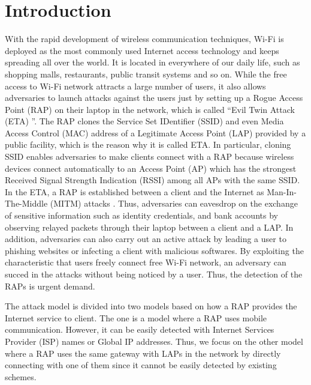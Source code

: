\documentclass[paper]{ieice}
\begin{document}
\section{Introduction}
With the rapid development of wireless communication techniques, Wi-Fi is deployed as the most commonly used Internet access technology and keeps spreading all over the world\cite{bg-evi}.
It is located in everywhere of our daily life, such as shopping malls, restaurants, public transit systems and so on.
While the free access to Wi-Fi network attracts a large number of users, it also allows adversaries to launch attacks against the users just by setting up a Rogue Access Point (RAP) on their laptop in the network, which is called ``Evil Twin Attack (ETA) ''\cite{laptop-evi}.
The RAP clones the Service Set IDentifier (SSID) and even Media Access Control (MAC) address of a Legitimate Access Point (LAP) provided by a public facility, which is the reason why it is called ETA.
In particular, cloning SSID enables adversaries to make clients connect with a RAP because wireless devices connect automatically to an Access Point (AP) which has the strongest Received Signal Strength Indication (RSSI) among all APs with the same SSID.
In the ETA, a RAP is established between a client and the Internet as Man-In-The-Middle (MITM) attacks \cite{spoof-evi}.
Thus, adversaries can eavesdrop on the exchange of sensitive information such as identity credentials, and bank accounts by observing relayed packets through their laptop between a client and a LAP.
In addition, adversaries can also carry out an active attack by leading a user to phishing websites or infecting a client with malicious softwares\cite{research}.
By exploiting the characteristic that users freely connect free Wi-Fi network,  an adversary can succed in the attacks without being noticed by a user.
Thus, the detection of the RAPs is urgent demand.

The attack model is divided into two models based on how a RAP provides the Internet service to client.
The one is a model where a RAP uses mobile communication.
However, it can be easily detected with Internet Services Provider (ISP) names or Global IP addresses\cite{rtt}.
Thus, we focus on the other model where a RAP uses the same gateway with LAPs in the network by directly connecting with one of them since it cannot be easily detected by existing schemes.
\end{document}
